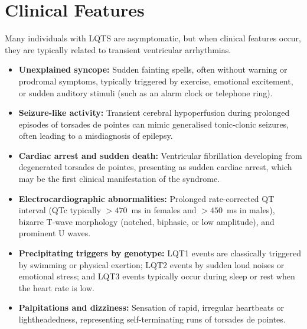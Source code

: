 \section*{Clinical Features}
Many individuals with LQTS are asymptomatic, but when clinical features occur, they are typically related to transient ventricular arrhythmias.
\begin{itemize}
    \item \textbf{Unexplained syncope:} Sudden fainting spells, often without warning or prodromal symptoms, typically triggered by exercise, emotional excitement, or sudden auditory stimuli (such as an alarm clock or telephone ring).
    \item \textbf{Seizure-like activity:} Transient cerebral hypoperfusion during prolonged episodes of torsades de pointes can mimic generalised tonic-clonic seizures, often leading to a misdiagnosis of epilepsy.
    \item \textbf{Cardiac arrest and sudden death:} Ventricular fibrillation developing from degenerated torsades de pointes, presenting as sudden cardiac arrest, which may be the first clinical manifestation of the syndrome.
    \item \textbf{Electrocardiographic abnormalities:} Prolonged rate-corrected QT interval (QTc typically $>470$~ms in females and $>450$~ms in males), bizarre T-wave morphology (notched, biphasic, or low amplitude), and prominent U waves.
    \item \textbf{Precipitating triggers by genotype:} LQT1 events are classically triggered by swimming or physical exertion; LQT2 events by sudden loud noises or emotional stress; and LQT3 events typically occur during sleep or rest when the heart rate is low.
    \item \textbf{Palpitations and dizziness:} Sensation of rapid, irregular heartbeats or lightheadedness, representing self-terminating runs of torsades de pointes.
\end{itemize}

